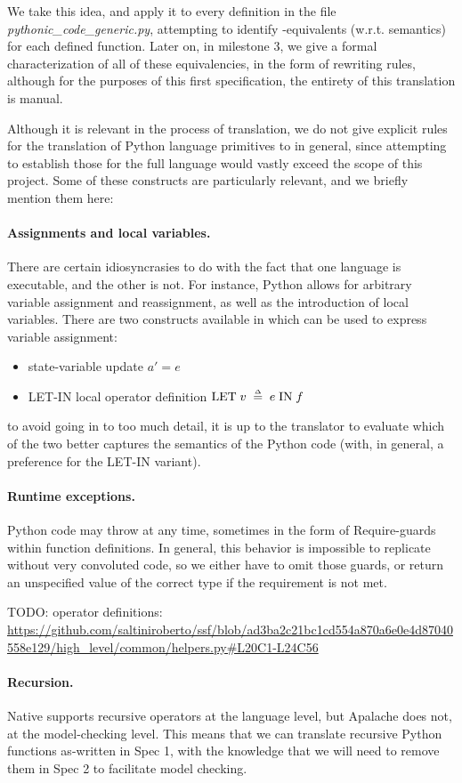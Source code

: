     We take this idea, and apply it to every definition in the file \emph{pythonic\_code\_generic.py}, attempting to identify \tlap{}-equivalents (w.r.t. semantics) for each defined function. 
    Later on, in milestone 3, we give a formal characterization of all of these equivalencies, in the form of rewriting rules, although for the purposes of this first specification, the entirety of this translation is manual.

    Although it is relevant in the process of translation, we do not give explicit rules for the translation of Python language primitives to \tlap{} in general, since attempting to establish those for the full language would vastly exceed the scope of this project. 
    Some of these constructs are particularly relevant, and we briefly mention them here:
    \paragraph{Assignments and local variables.} There are certain idiosyncrasies to do with the fact that one language is executable, and the other is not. For instance, Python allows for arbitrary variable assignment and reassignment, as well as the introduction of local variables. There are two constructs available in \tlap{} which can be used to express variable assignment:
    \begin{itemize}
      \item state-variable update $a' = e$
      \item LET-IN local operator definition $\mathrm{LET}\; v \;\mathrel{\smash {{\stackrel{\scriptscriptstyle\Delta}{=}}}}\; e \;\mathrm{IN}\; f$
    \end{itemize}
    to avoid going in to too much detail, it is up to the translator to evaluate which of the two better captures the semantics of the Python code (with, in general, a preference for the LET-IN variant).
    \paragraph{Runtime exceptions.} Python code may throw at any time, sometimes in the form of $\mathrm{Require}$-guards within function definitions. 
    In general, this behavior is impossible to replicate without very convoluted \tlap{} code, so we either have to omit those guards, or return an unspecified value of the correct type if the requirement is not met.

    TODO: operator definitions: \url{https://github.com/saltiniroberto/ssf/blob/ad3ba2c21bc1cd554a870a6e0e4d87040558e129/high_level/common/helpers.py#L20C1-L24C56}

\paragraph{Recursion.} Native \tlap{} supports recursive operators at the language level, but Apalache does not, at the model-checking level. This means that we can translate recursive Python functions as-written in Spec 1, with the knowledge that we will need to remove them in Spec 2 to facilitate model checking.

